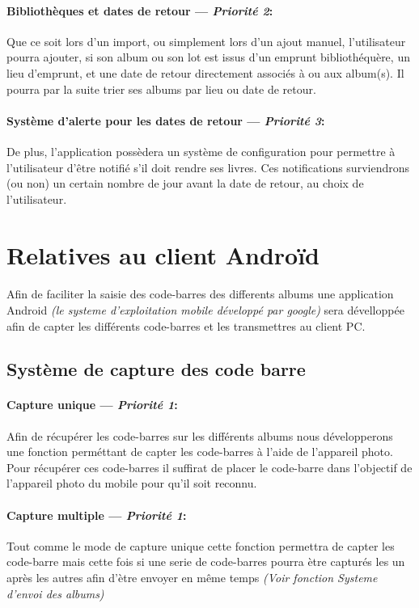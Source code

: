 \paragraph{Bibliothèques et dates de retour ---  \textit{Priorité 2}:}
Que ce soit lors d'un import, ou simplement lors d'un ajout manuel, l'utilisateur pourra ajouter, si son album ou son lot est issus d'un emprunt bibliothéquère, un lieu d'emprunt, et une date de retour directement associés à ou aux album(s). Il pourra par la suite trier ses albums par lieu ou date de retour.
\paragraph{Système d'alerte pour les dates de retour ---  \textit{Priorité 3}:}  
De plus, l'application possèdera un système de configuration pour permettre à l'utilisateur d'être notifié s'il doit rendre ses livres. Ces notifications surviendrons (ou non) un certain nombre de jour avant la date de retour, au choix de l'utilisateur.



\section{Relatives au client Androïd} 


\paragraph{}
Afin de faciliter la saisie des code-barres des differents albums une application Android \textit{(le systeme d'exploitation mobile développé par google)} sera dévelloppée afin de capter les différents code-barres et les transmettres au client PC.

\subsection{Système de capture des code barre}
\paragraph{Capture unique ---  \textit{Priorité 1}:}
Afin de récupérer les code-barres sur les différents albums nous développerons une fonction perméttant de capter les code-barres à l'aide de l'appareil photo.
Pour récupérer ces code-barres il suffirat de placer le code-barre dans l'objectif de l'appareil photo du mobile pour qu'il soit reconnu.

\paragraph{Capture multiple ---  \textit{Priorité 1}:}
Tout comme le mode de capture unique cette fonction permettra de capter les code-barre mais cette fois si une serie de code-barres pourra ètre capturés les un après les autres afin d'ètre envoyer en même temps \textit{(Voir fonction Systeme d'envoi des albums)}

